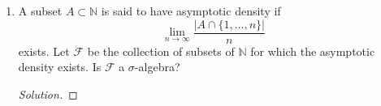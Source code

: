 \documentclass[11pt,letterpaper]{report}
\newcommand{\naturals}{\mathbb{N}}
\newcommand{\mcal}[1]{\mathcal{#1}}
\newenvironment{solution}
{\begin{proof}[Solution]}
{\end{proof}}
\begin{document}
\begin{enumerate}
\begin{enumerate}
		\item Let $\mcal{F}$ and $\mcal{G}$ be two $\sigma$-algebras of subsets of $\Omega$. Is $\mcal{F}\cup \mcal{G}$ always a $\sigma$-algebra?
		\begin{solution}
			The union need not be a $\sigma$-algebra. Let $\Omega = \{1, 2, 3, 4\}$, $\mcal{F} = \{\emptyset, \Omega, \{1\}, \{2, 3, 4\}\}$, and $\mcal{G} = \{\emptyset, \Omega, \{2\}, \{1, 3, 4\}\}$. $\mcal{F}$ and $\mcal{G}$ are $\sigma$-algebras, but the set $\{1\}\cup \{2\} = \{1,2\}$ is not in their union.
		\end{solution}
	\end{enumerate}

	\item A subset $A\subset \naturals$ is said to have asymptotic density if
	\[
	\lim_{n\to \infty}\frac{|A\cap \{1, \ldots, n\}|}{n}
	\]
	exists. Let $\mcal{F}$ be the collection of subsets of $\naturals$ for which the asymptotic density exists. Is $\mcal{F}$ a $\sigma$-algebra?
	\begin{solution}
		
	\end{solution}
\end{enumerate}
\end{document}

